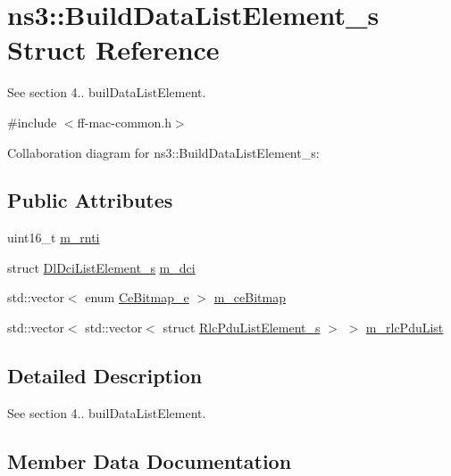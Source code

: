 \hypertarget{structns3_1_1BuildDataListElement__s}{}\section{ns3\+:\+:Build\+Data\+List\+Element\+\_\+s Struct Reference}
\label{structns3_1_1BuildDataListElement__s}


See section 4.. buil\+Data\+List\+Element.  




{\ttfamily \#include $<$ff-\/mac-\/common.\+h$>$}



Collaboration diagram for ns3\+:\+:Build\+Data\+List\+Element\+\_\+s\+:
\subsection*{Public Attributes}
\begin{DoxyCompactItemize}
\item 
uint16\+\_\+t \hyperlink{structns3_1_1BuildDataListElement__s_a79778ce303b4c73fd10df582b015361f}{m\+\_\+rnti}
\item 
struct \hyperlink{structns3_1_1DlDciListElement__s}{Dl\+Dci\+List\+Element\+\_\+s} \hyperlink{structns3_1_1BuildDataListElement__s_ad0148c3da328bbddd264f174e026718f}{m\+\_\+dci}
\item 
std\+::vector$<$ enum \hyperlink{namespacens3_aac21e8089f0189907f822d63ccdb36ea}{Ce\+Bitmap\+\_\+e} $>$ \hyperlink{structns3_1_1BuildDataListElement__s_affc8104dae3a75d16e84bc3ab954cd7e}{m\+\_\+ce\+Bitmap}
\item 
std\+::vector$<$ std\+::vector$<$ struct \hyperlink{structns3_1_1RlcPduListElement__s}{Rlc\+Pdu\+List\+Element\+\_\+s} $>$ $>$ \hyperlink{structns3_1_1BuildDataListElement__s_aefcb545ea5b4a7a8f0b54acae824e95a}{m\+\_\+rlc\+Pdu\+List}
\end{DoxyCompactItemize}


\subsection{Detailed Description}
See section 4.. buil\+Data\+List\+Element. 

\subsection{Member Data Documentation}
